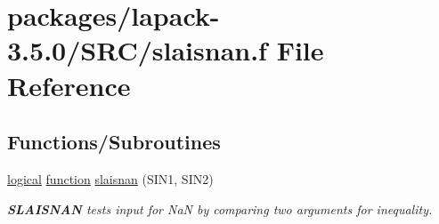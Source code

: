 \hypertarget{slaisnan_8f}{}\section{packages/lapack-\/3.5.0/\+S\+R\+C/slaisnan.f File Reference}
\label{slaisnan_8f}
\subsection*{Functions/\+Subroutines}
\begin{DoxyCompactItemize}
\item 
\hyperlink{tnc_8c_aa7b64cdf39500931f7b333343791a104}{logical} \hyperlink{afunc_8m_a7b5e596df91eadea6c537c0825e894a7}{function} \hyperlink{group__auxOTHERauxiliary_ga9b6a1036554ed9b7196c641174d6a6da}{slaisnan} (S\+I\+N1, S\+I\+N2)
\begin{DoxyCompactList}\small\item\em {\bfseries S\+L\+A\+I\+S\+N\+A\+N} tests input for Na\+N by comparing two arguments for inequality. \end{DoxyCompactList}\end{DoxyCompactItemize}
